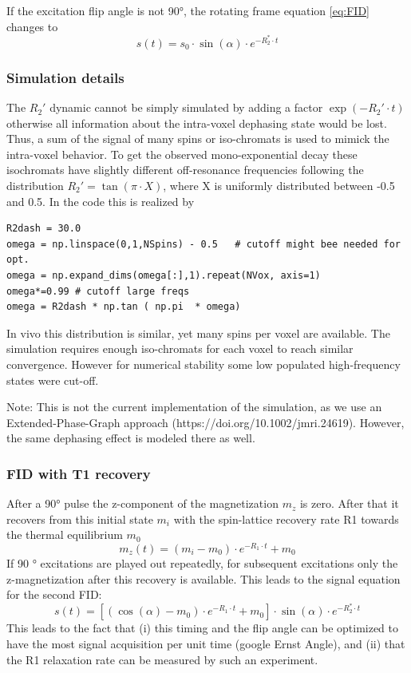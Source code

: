 \documentclass[a4paper,12pt]{extarticle}
\begin{document}
If the excitation flip angle is not 90°, the rotating frame equation \eqref{eq:FID} changes to
\begin{equation}
\label{eq:FIDalpha}
s(t)=s_0\cdot \sin(\alpha)\cdot e^{-R_2^*\cdot t}
\end{equation}
\subsubsection{Simulation details}
The $R_2'$ dynamic cannot be simply simulated by adding a factor $\exp{(-R_2'\cdot t)}$ otherwise all information about the intra-voxel dephasing state would be lost. Thus, a sum of the signal of many spins or iso-chromats is used to mimick the intra-voxel behavior.
To get the observed mono-exponential decay these isochromats have slightly different off-resonance frequencies following the distribution $R_2'=\tan{(\pi\cdot X)}$, where X is uniformly distributed between -0.5 and 0.5. In the code this is realized by 
\begin{verbatim}
R2dash = 30.0
omega = np.linspace(0,1,NSpins) - 0.5   # cutoff might bee needed for opt.
omega = np.expand_dims(omega[:],1).repeat(NVox, axis=1)
omega*=0.99 # cutoff large freqs
omega = R2dash * np.tan ( np.pi  * omega)
\end{verbatim}
In vivo this distribution is similar, yet many spins per voxel are available. The simulation requires enough iso-chromats for each voxel to reach similar convergence. However for numerical stability some low populated high-frequency states were cut-off.

Note: This is not the current implementation of the simulation, as we use an Extended-Phase-Graph approach (https://doi.org/10.1002/jmri.24619). However, the same dephasing effect is modeled there as well.

\subsubsection{FID with T1 recovery}

After a 90° pulse the z-component of the magnetization $m_z$ is zero. After that it recovers from this initial state $m_i$ with the spin-lattice recovery rate R1 towards the thermal equilibrium $m_0$
\begin{equation}
\label{eq:T1_rec}
m_z(t)= (m_i-m_0)\cdot e^{-R_1\cdot t } +m_0
\end{equation}If  90 ° excitations are played out repeatedly, for subsequent excitations  only the z-magnetization after this recovery is available. This leads to the signal equation for the second FID:
\begin{equation}
\label{eq:FID_T1}
s(t)=[(\cos(\alpha)-m_0)\cdot e^{-R_1\cdot t } +m_0]\cdot \sin(\alpha)\cdot e^{-R_2^*\cdot t}
\end{equation}This leads to the fact that (i) this timing and the flip angle can be optimized to have the most signal acquisition per unit time (google Ernst Angle), and (ii) that the R1 relaxation rate can be measured by such an experiment.
\end{document}

